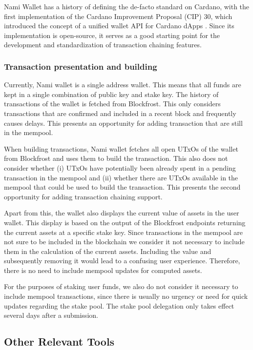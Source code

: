 \documentclass[11pt]{article}
\begin{document}
Nami Wallet has a history of defining the de-facto standard on Cardano, with the first implementation of the Cardano Improvement Proposal (CIP) 30, which introduced the concept of a unified wallet API for Cardano dApps \cite{cip30}.
Since its implementation is open-source, it serves as a good starting point for the development and standardization of transaction chaining features.

\subsubsection{Transaction presentation and building}

Currently, Nami wallet is a single address wallet.
This means that all funds are kept in a single combination of public key and stake key.
The history of transactions of the wallet is fetched from Blockfrost.
This only considers transactions that are confirmed and included in a recent block and frequently causes delays.
This presents an opportunity for adding transaction that are still in the mempool.

When building transactions, Nami wallet fetches all open UTxOs of the wallet from Blockfrost
and uses them to build the transaction.
This also does not consider whether (i) UTxOs have potentially been already spent in a pending transaction in the mempool and
(ii) whether there are UTxOs available in the mempool that could be used to build the transaction.
This presents the second opportunity for adding transaction chaining support.

Apart from this, the wallet also displays the current value of assets in the user wallet.
This display is based on the output of the Blockfrost endpoints returning the current assets at a specific stake key.
Since transactions in the mempool are not sure to be included in the blockchain
we consider it not necessary to include them in the calculation of the current assets.
Including the value and subsequently removing it would lead to a confusing user experience.
Therefore, there is no need to include mempool updates for computed assets.

For the purposes of staking user funds, we also do not consider it necessary to include mempool transactions,
since there is usually no urgency or need for quick updates regarding the stake pool.
The stake pool delegation only takes effect several days after a submission.

\subsection{Other Relevant Tools}
\end{document}

